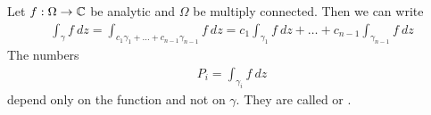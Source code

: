 \begin{definition}
    Let $f: \Omega \rightarrow \mathbb{C}$ be analytic and $\Omega$ be multiply connected.
    Then we can write
    \begin{align*}
        \int_\gamma f \ dz
        = \int_{c_1 \gamma_1 + \dots + c_{n-1} \gamma_{n-1}} f \ dz
        = c_1 \int_{\gamma_1} f \ dz + \dots + c_{n-1} \int_{\gamma_{n-1}} f \ dz
    \end{align*}
    The numbers
    \begin{align*}
        P_i = \int_{\gamma_i} f \ dz
    \end{align*}
    depend only on the function and not on $\gamma$. They are called  or .
\end{definition}
